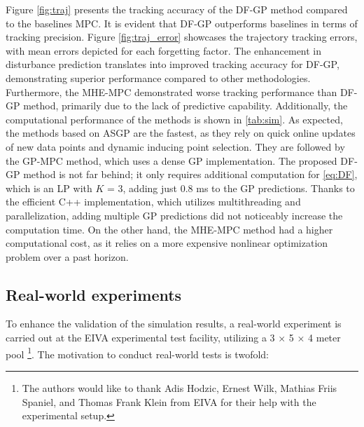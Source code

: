 Figure \ref{fig:traj} presents the tracking accuracy of the \ac{DF-GP} method compared to the baselines \ac{MPC}. It is evident that \ac{DF-GP} outperforms baselines in terms of tracking precision.  Figure \ref{fig:traj_error} showcases the trajectory tracking errors, with mean errors depicted for each forgetting factor. The enhancement in disturbance prediction translates into improved tracking accuracy for \ac{DF-GP}, demonstrating superior performance compared to other methodologies. Furthermore, the \ac{MHE}-\ac{MPC} demonstrated worse tracking performance than \ac{DF-GP} method, primarily due to the lack of predictive capability. Additionally, the computational performance of the methods is shown in \ref{tab:sim}. As expected, the methods based on \ac{ASGP} are the fastest, as they rely on quick online updates of new data points and dynamic inducing point selection. They are followed by the \ac{GP}-\ac{MPC} method, which uses a dense \ac{GP} implementation. The proposed \ac{DF-GP} method is not far behind; it only requires additional computation for \eqref{eq:DF}, which is an \ac{LP} with $K$ = 3, adding just 0.8 ms to the \ac{GP} predictions. Thanks to the efficient C++ implementation, which utilizes multithreading and parallelization, adding multiple \ac{GP} predictions did not noticeably increase the computation time. On the other hand, the \ac{MHE}-\ac{MPC} method had a higher computational cost, as it relies on a more expensive nonlinear optimization problem over a past horizon. 



\subsection{Real-world experiments }
\label{sec:real}
To enhance the validation of the simulation results, a real-world experiment is carried out at the EIVA experimental test facility, utilizing a 3 × 5 × 4 meter pool \footnote{The authors would like to thank Adis Hodzic, Ernest Wilk, Mathias Friis Spaniel, and Thomas Frank Klein from EIVA for their help with the experimental setup.}.  The motivation to conduct real-world tests is twofold:

